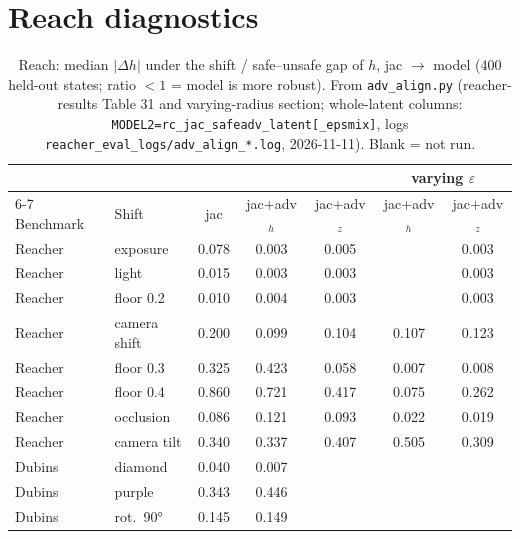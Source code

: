 \documentclass{article}
\begin{document}
\section{Reach diagnostics}
\label{app:reach}
\begin{table}[t]\centering\small
\caption{Reach: median $|\Delta h|$ under the shift / safe--unsafe gap of $h$, jac $\to$ model (400 held-out states; ratio $<1$ = model is more robust). From \texttt{adv\_align.py} (reacher-results Table 31 and varying-radius section; whole-latent columns: \texttt{MODEL2=rc\_jac\_safeadv\_latent[\_epsmix]}, logs \texttt{reacher\_eval\_logs/adv\_align\_*.log}, 2026-11-11). Blank = not run.}
\label{tab:reach}
\begin{tabular}{llccccc}
\toprule
 & & & & & \multicolumn{2}{c}{varying $\varepsilon$} \\
\cmidrule(lr){6-7}
Benchmark & Shift & jac & jac+adv$_h$ & jac+adv$_z$ & jac+adv$_h$ & jac+adv$_z$ \\
\midrule
Reacher & exposure & 0.078 & 0.003 & 0.005  &  & 0.003  \\
Reacher & light & 0.015 & 0.003 & 0.003  &  & 0.003  \\
Reacher & floor 0.2 & 0.010 & 0.004 & 0.003  &  & 0.003  \\
Reacher & camera shift & 0.200 & 0.099 & 0.104  & 0.107 & 0.123  \\
Reacher & floor 0.3 & 0.325 & 0.423 & 0.058  & 0.007 & 0.008  \\
Reacher & floor 0.4 & 0.860 & 0.721 & 0.417  & 0.075 & 0.262  \\
Reacher & occlusion & 0.086 & 0.121 & 0.093  & 0.022 & 0.019  \\
Reacher & camera tilt & 0.340 & 0.337 & 0.407  & 0.505 & 0.309  \\
Dubins & diamond & 0.040 & 0.007 & & & \\
Dubins & purple & 0.343 & 0.446 & & & \\
Dubins & rot.\ 90° & 0.145 & 0.149 & & & \\
\bottomrule
\end{tabular}
\end{table}
\end{document}
